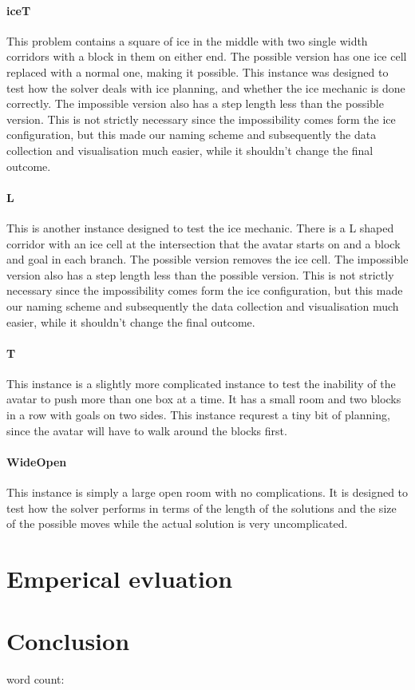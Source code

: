 \documentclass[british]{article}
\begin{document}
	\paragraph{iceT} This problem contains a square of ice in the middle with two single width corridors with a block in them on either end. The possible version has one ice cell replaced with a normal one, making it possible. This instance was designed to test how the solver deals with ice planning, and whether the ice mechanic is done correctly. The impossible version also has a step length less than the possible version. This is not strictly necessary since the impossibility comes form the ice configuration, but this made our naming scheme and subsequently the data collection and visualisation much easier, while it shouldn't change the final outcome. 
	\paragraph{L} This is another instance designed to test the ice mechanic. There is a L shaped corridor with an ice cell at the intersection that the avatar starts on and a block and goal in each branch. The possible version removes the ice cell. The impossible version also has a step length less than the possible version. This is not strictly necessary since the impossibility comes form the ice configuration, but this made our naming scheme and subsequently the data collection and visualisation much easier, while it shouldn't change the final outcome.  
	\paragraph{T} This instance is a slightly more complicated instance to test the inability of the avatar to push more than one box at a time. It has a small room and two blocks in a row with goals on two sides. This instance requrest a tiny bit of planning, since the avatar will have to walk around the blocks first. 
	\paragraph{WideOpen} This instance is simply a large open room with no complications. It is designed to test how the solver performs in terms of the length of the solutions and the size of the possible moves while the actual solution is very uncomplicated. 

\section{Emperical evluation}
\label{results}

\section{Conclusion}
\label{conclusion}

 
 
 
word count: 
\printbibliography
\end{document}
